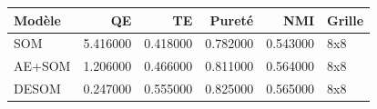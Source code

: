 \begin{tabular}{lrrrrl}
\toprule
Modèle & QE & TE & Pureté & NMI & Grille \\
\midrule
SOM & 5.416000 & 0.418000 & 0.782000 & 0.543000 & 8x8 \\
AE+SOM & 1.206000 & 0.466000 & 0.811000 & 0.564000 & 8x8 \\
DESOM & 0.247000 & 0.555000 & 0.825000 & 0.565000 & 8x8 \\
\bottomrule
\end{tabular}
